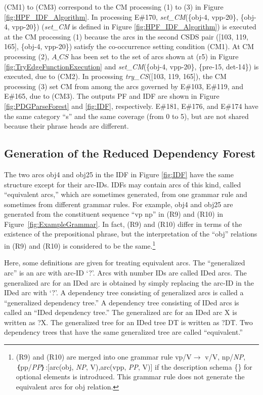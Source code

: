 \documentclass[english]{jnlp_1.4_rep}
\theoremstyle{break}
\theoremstyle{plain}
\theoremstyle{plain}
\begin{document}
\noindent
(CM1) to (CM3) correspond to the CM processing (1) to (3)
in Figure \ref{fig:HPF_IDF_Algorithm}. In processing E\#170,
\textit{set\_CM}(\{obj-4, vpp-20\}, \{obj-4, vpp-20\}) (\textit{set\_CM} is
defined in Figure \ref{fig:HPF_IDF_Algorithm}) is executed at the CM
processing (1) because the arcs in the second CSDS pair ([103, 119,
  165], \{obj-4, vpp-20\}) satisfy the co-occurrence setting condition
(CM1). At CM processing (2), $A\_CS$ has been set to the set of arcs
shown at (r5) in Figure \ref{fig:TryEdgeFunctionExecution} and
\textit{set\_CM}(\{obj-4, vpp-20\}, \{pre-15, det-14\}) is executed, due to
(CM2). In processing \textit{try\_CS}([103, 119, 165]), the CM processing
(3) set CM from among the arcs governed by E\#103, E\#119, and E\#165,
due to (CM3). The outputs PF and IDF are shown in
Figure \ref{fig:PDGParseForest} and \ref{fig:IDF},
respectively. E\#181, E\#176, and E\#174 have the same category ``s''
and the same coverage (from 0 to 5), but are not shared because their
phrase heads are different.


\subsection{Generation of the Reduced Dependency Forest}

The two arcs obj4 and obj25 in the IDF in Figure \ref{fig:IDF} have the
same structure except for their arc-IDs. IDFs may contain arcs of this
kind, called ``equivalent arcs,'' which are sometimes generated, from
one grammar rule and sometimes from different grammar rules. For
example, obj4 and obj25 are generated from the constituent sequence
``vp np'' in (R9) and (R10) in Figure~\ref{fig:ExampleGrammar}. In fact,
(R9) and (R10) differ in terms of the existence of the prepositional
phrase, but the interpretation of the ``obj'' relations in (R9) and
(R10) is considered to be the same.\footnote{(R9) and (R10) are merged
into one grammar rule vp/V$\rightarrow$ v/V, np/\textit{NP},
｛pp/\textit{PP}｝:[arc(obj, \textit{NP}, V),arc(vpp, \textit{PP}, V)] if the description
schema \{\} for optional elements is introduced. This grammar rule
does not generate the equivalent arcs for obj relation.}

Here, some definitions are given for treating equivalent arcs. The
``generalized arc'' is an arc with arc-ID `?'. Arcs with number IDs
are called IDed arcs. The generalized arc for an IDed arc is obtained
by simply replacing the arc-ID in the IDed arc with `?'. A dependency
tree consisting of generalized arcs is called a ``generalized
dependency tree.'' A dependency tree consisting of IDed arcs is called
an ``IDed dependency tree.'' The generalized arc for an IDed arc X is
written as ?X. The generalized tree for an IDed tree DT is written as
?DT. Two dependency trees that have the same generalized tree are
called ``equivalent.''
\end{document}
